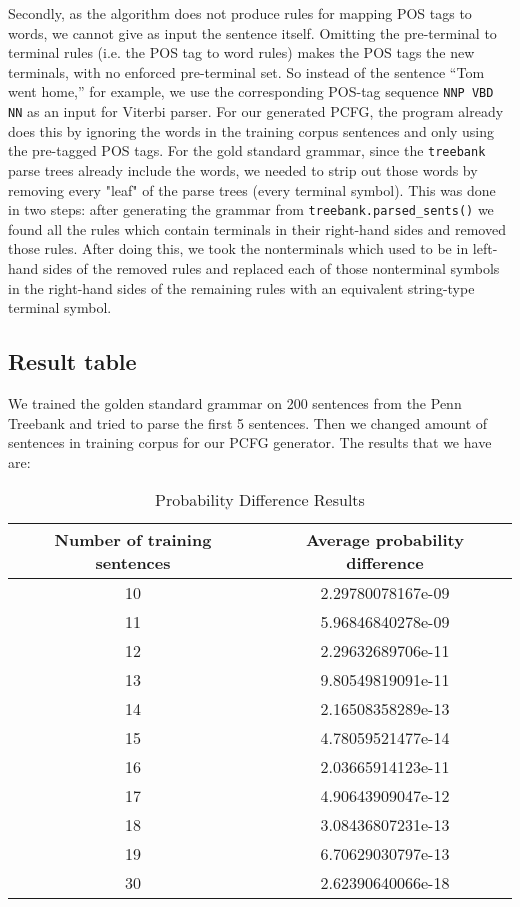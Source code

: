 \documentclass[paper=a4, fontsize=11pt]{scrartcl} %
\numberwithin{equation}{section} %
\numberwithin{figure}{section} %
\numberwithin{table}{section} %
\begin{document}
Secondly, as the algorithm does not produce rules for mapping POS tags to words, we cannot give as input the sentence itself. Omitting the pre-terminal to terminal rules (i.e. the POS tag to word rules) makes the POS tags the new terminals, with no enforced pre-terminal set. So instead of the sentence ``Tom went home,'' for example, we use the corresponding POS-tag sequence \texttt{NNP VBD NN} as an input for Viterbi parser.
For our generated PCFG, the program already does this by ignoring the words in the training corpus sentences and only using the pre-tagged POS tags. 
For the gold standard grammar, since the \texttt{treebank} parse trees already include the words, we needed to strip out those words by removing every "leaf" of the parse trees (every terminal symbol). This was done in two steps: after generating the grammar from \texttt{treebank.parsed\_sents()} we found all the rules which contain terminals in their right-hand sides and removed those rules. After doing this, we took the nonterminals which used to be in left-hand sides of the removed rules and replaced each of those nonterminal symbols in the right-hand sides of the remaining rules with an equivalent string-type terminal symbol.

\subsection{Result table}

We trained the golden standard grammar on 200 sentences from the Penn Treebank and tried to parse the first 5 sentences. Then we changed amount of sentences in training corpus for our PCFG generator. The results that we have are:

\begin{table}[ht]
\caption{Probability Difference Results}
\centering
\begin{tabular}{c c}
\hline\hline
Number of training sentences & Average probability difference \\ [0.5ex]
\hline
10&2.29780078167e-09 \\
11&5.96846840278e-09 \\
12&2.29632689706e-11 \\
13&9.80549819091e-11 \\
14& 2.16508358289e-13 \\
15&4.78059521477e-14 \\
16&2.03665914123e-11 \\
17&4.90643909047e-12 \\
18&3.08436807231e-13 \\
19&6.70629030797e-13 \\
30&2.62390640066e-18 \\ [1ex]
\hline
\end{tabular}
\label{table:nonlin}
\end{table}
\end{document}

